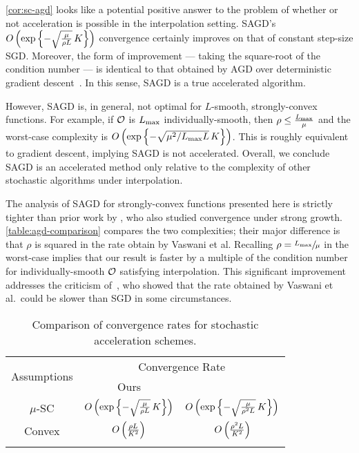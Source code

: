 \autoref{cor:sc-agd} looks like a potential positive answer to the problem of whether or not acceleration is possible in the interpolation setting.
SAGD's \( O\rbr{ \exp \cbr{- \sqrt{\frac{\mu}{\rho L}} \, K}} \) convergence certainly improves on that of constant step-size SGD.
Moreover, the form of improvement --- taking the square-root of the condition number --- is identical to that obtained by AGD over deterministic gradient descent~\citep{nesterov2004lectures}.
In this sense, SAGD is a true accelerated algorithm.

However, SAGD is, in general, not optimal for \( L \)-smooth, strongly-convex functions. 
For example, if \( \oracle{} \) is \( \Lmax \) individually-smooth, then \( \rho \leq \frac{\Lmax}{\mu} \) and the worst-case complexity is \( O\rbr{ \exp \cbr{- \sqrt{\mu^2 / \Lmax L} \, K}}\).
This is roughly equivalent to gradient descent, implying SAGD is not accelerated. 
Overall, we conclude SAGD is an accelerated method only relative to the complexity of other stochastic algorithms under interpolation.

The analysis of SAGD for strongly-convex functions presented here is strictly tighter than prior work by \citet[Theorem 1]{vaswani2019fast}, who also studied convergence under strong growth.
\autoref{table:agd-comparison} compares the two complexities; their major difference is that \( \rho \) is squared in the rate obtain by Vaswani et al. 
Recalling \( \rho = \sfrac{\Lmax}{\mu} \) in the worst-case implies that our result is faster by a multiple of the condition number for individually-smooth \( \oracle{} \) satisfying interpolation.
This significant improvement addresses the criticism of~\citet{Liu2020Accelerating}, who showed that the rate obtained by Vaswani et al.\ could be slower than SGD in some circumstances. 

\begin{table}[t]
    \centering
    \begin{tabular}{c c c  }\toprule
        \multirow{2}{*}{Assumptions} & \multicolumn{2}{c}{Convergence Rate}\\%
        \cmidrule(lr){2-3} 
                 & \multicolumn{1}{c}{Ours} & \multicolumn{1}{c}{\citet{vaswani2019painless}}\\ \midrule
        \( \mu \)-SC & \( O\rbr{\exp\cbr{- \sqrt{\frac{\mu}{\rho L}} \, K}} \)%
                     & \( O\rbr{\exp\cbr{- \sqrt{\frac{\mu}{\rho^2 L}} \, K}} \) \\ \addlinespace
        Convex       & \( O\rbr{\frac{\rho L}{K^2}} \)%
                 & \( O\rbr{\frac{\rho^2 L}{K^2}} \)\\ \addlinespace 
        \end{tabular}
        \caption{Comparison of convergence rates for stochastic acceleration schemes.}%
    \label{table:agd-comparison}
\end{table}

